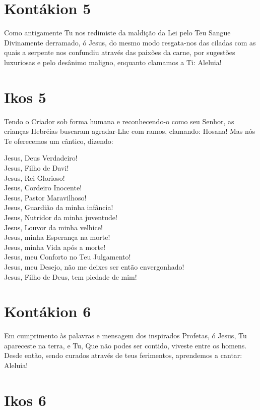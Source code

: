 \documentclass{subfiles}
\begin{document}
\section{Kontákion 5}

Como antigamente Tu nos redimiste da maldição da Lei pelo Teu
Sangue Divinamente derramado, ó Jesus, do mesmo modo resgata-nos das
ciladas com as quais a serpente nos confundiu através das paixões da carne,
por sugestões luxuriosas e pelo desânimo maligno, enquanto clamamos a Ti:
Aleluia!

\section{Ikos 5}

Tendo o Criador sob forma humana e reconhecendo-o como seu
Senhor, as crianças Hebréias buscaram agradar-Lhe com ramos, clamando:
Hosana! Mas nós Te oferecemos um cântico, dizendo:

Jesus, Deus Verdadeiro! \\
Jesus, Filho de Davi! \\
Jesus, Rei Glorioso! \\
Jesus, Cordeiro Inocente! \\
Jesus, Pastor Maravilhoso! \\
Jesus, Guardião da minha infância! \\
Jesus, Nutridor da minha juventude! \\
Jesus, Louvor da minha velhice! \\
Jesus, minha Esperança na morte! \\
Jesus, minha Vida após a morte! \\
Jesus, meu Conforto no Teu Julgamento! \\
Jesus, meu Desejo, não me deixes ser então envergonhado! \\
Jesus, Filho de Deus, tem piedade de mim!

\section{Kontákion 6}

Em cumprimento às palavras e mensagem dos inspirados Profetas, ó
Jesus, Tu apareceste na terra, e Tu, Que não podes ser contido, viveste entre
os homens. Desde então, sendo curados através de teus ferimentos,
aprendemos a cantar: Aleluia!

\section{Ikos 6}
\end{document}
